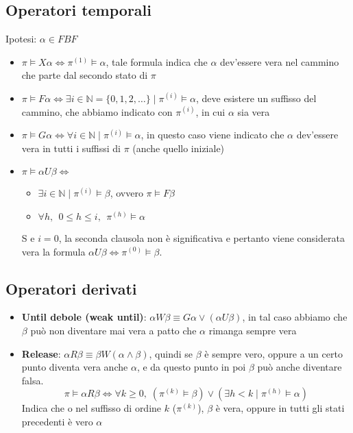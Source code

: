 \subsection{Operatori temporali}
Ipotesi: $\alpha \in FBF$
    \begin{itemize}
    
    \item $\pi \vDash X \alpha \Leftrightarrow \pi^{(1)} \vDash \alpha$, tale formula indica che $\alpha$ dev’essere vera nel cammino che parte dal secondo stato di $\pi$
    \item $\pi \vDash F \alpha \Leftrightarrow \exists i \in \mathbb{N} = \{0,1,2,\dots \} \; | \; \pi^{(i)} \vDash \alpha$, deve esistere un suffisso del cammino, che abbiamo indicato con $\pi^{(i)}$, in cui $\alpha$ sia vera
    \item $\pi \vDash G \alpha \Leftrightarrow \forall i \in \mathbb{N} \; | \; \pi^{(i)} \vDash \alpha$, in questo caso viene indicato che $\alpha$ dev’essere vera in tutti i suffissi di $\pi$ (anche quello iniziale)
    \item $\pi \vDash \alpha U \beta \Leftrightarrow $
        \begin{itemize}
            \item$\exists i \in \mathbb{N} \; | \; \pi^{(i)} \vDash \beta$, ovvero $\pi \vDash F \beta$
            \item$\forall h, \; \, 0 \leq h \leq i, \; \, \pi^{(h)} \vDash \alpha$ 
        \end{itemize}
    S e $i=0$, la seconda clausola non è significativa e pertanto viene considerata vera la formula $\alpha U \beta \Leftrightarrow \pi^{(0)} \vDash \beta$.
\end{itemize}
\subsection{Operatori derivati}
\begin{itemize}
    \item \textbf{Until debole (weak until)}: $\alpha W \beta \equiv G \alpha \lor (\alpha U \beta)$, in tal caso abbiamo che $\beta$ può non diventare mai vera a patto che $\alpha$ rimanga sempre vera
    \item \textbf{Release}: $\alpha R \beta \equiv \beta W (\alpha \land \beta)$, quindi se $\beta$ è sempre vero, oppure a un certo punto diventa  vera anche $\alpha$, e da questo punto in poi $\beta$ può anche diventare falsa.
    \[\pi \vDash \alpha R \beta \Leftrightarrow \forall k \geq 0, \;(\pi^{(k)} \vDash \beta) \lor (\exists h < k \; | \; \pi^{(h)} \vDash \alpha) \]
    Indica che o nel suffisso di ordine $k$ ($\pi^{(k)}$), $\beta$ è vera, oppure in tutti gli stati precedenti è vero $\alpha$
\end{itemize}
